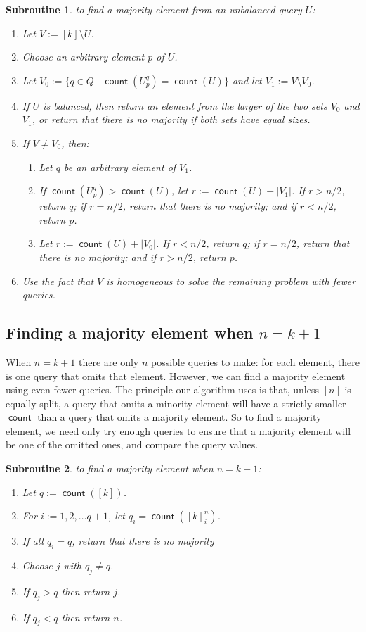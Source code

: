 \documentclass[11pt]{llncs}
\newcommand{\qcount}{\operatorname{\mathsf{count}}}
\newcommand{\assign}{:=}
\newtheorem{subroutine}{Subroutine}
\begin{document}
\begin{subroutine} to find a majority element from an unbalanced query $U$:
\begin{enumerate}
\item Let $V\assign[k]\setminus U$.
\item Choose an arbitrary element $p$ of $U$.
\item Let $V_0\assign\{q\in Q\mid \qcount(U_p^q)=\qcount(U)\}$ and let $V_1\assign V\setminus V_0$.
\item If $U$ is balanced, then return an element from the larger of the two sets $V_0$ and $V_1$, or return that there is no majority if both sets have equal sizes.
\item If $V\ne V_0$, then:
\begin{enumerate}
\item Let $q$ be an arbitrary element of $V_1$.
\item If $\qcount(U_p^q)>\qcount(U)$, let $r\assign \qcount(U)+|V_1|$. If $r>n/2$, return $q$; if $r=n/2$, return that there is no majority; and if $r<n/2$, return $p$.
\item Let $r\assign \qcount(U)+|V_0|$. If $r<n/2$, return $q$; if $r=n/2$, return that there is no majority; and if $r>n/2$, return $p$.
\end{enumerate}
\item Use the fact that $V$ is homogeneous to solve the remaining problem with fewer queries.
\end{enumerate}
\end{subroutine}

\fi

\subsection{Finding a majority element when $n=k+1$}

When $n=k+1$ there are only $n$ possible queries to make: for each element, there is one query that omits that element. However, we can find a majority element using even fewer queries. The principle our algorithm uses is that, unless $[n]$ is equally split, a query that omits a minority element will have a strictly smaller $\qcount$ than a query that omits a majority element. So to find a majority element, we need only try enough queries to ensure that a majority element will be one of the omitted ones, and compare the query values.

\begin{subroutine} to find a majority element when $n=k+1$:
\begin{enumerate}
\item Let $q\assign \qcount([k])$.
\item For $i\assign 1,2,\dots q+1$, let $q_i = \qcount( [k]_i^n )$.
\item If all $q_i=q$, return that there is no majority
\item Choose $j$ with $q_j\ne q$.
\item If $q_j > q$ then return $j$.
\item If $q_j < q$ then return $n$.
\end{enumerate}
\end{subroutine}
\end{document}

